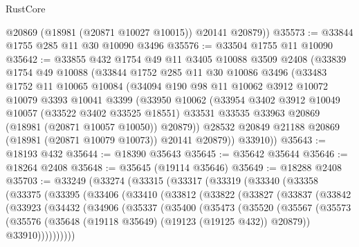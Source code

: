 \begin{lexlean}{RustCore}
\begin{coremodule}
        @20869
        (@18981 (@20871 @10027 @10015))
        @20141
        @20879))
@35573 := @33844 @1755 @285 @11 @30 @10090 @3496
@35576 := @33504 @1755 @11 @10090
@35642 := @33855
    @432
    @1754
    @49
    @11
    @3405
    @10088
    @3509
    @2408
    (@33839
      @1754
      @49
      @10088
      (@33844
        @1752
        @285
        @11
        @30
        @10086
        @3496
        (@33483
          @1752
          @11
          @10065
          @10084
          (@34094
            @190
            @98
            @11
            @10062
            @3912
            @10072
            @10079
            @3393
            @10041
            @3399
            (@33950
              @10062
              (@33954
                @3402
                @3912
                @10049
                @10057
                (@33522 @3402 @33525 @18551)
                @33531
                @33535
                @33963
                @20869
                (@18981 (@20871 @10057 @10050))
                @20879))
            @28532
            @20849
            @21188
            @20869
            (@18981 (@20871 @10079 @10073))
            @20141
            @20879))
        @33910))
@35643 := @18193 @432
@35644 := @18390 @35643
@35645 := @35642 @35644
@35646 := @18264 @2408
@35648 := @35645 (@19114 @35646)
@35649 := @18288 @2408
@35703 := @33249
    (@33274
      (@33315
        (@33317
          (@33319
            (@33340
              (@33358
                (@33375
                  (@33395
                    (@33406
                      (@33410
                        (@33812
                          (@33822
                            (@33827
                              (@33837
                                (@33842
                                  (@33923
                                    (@34432
                                      (@34906
                                        (@35337
                                          (@35400
                                            (@35473
                                              (@35520
                                                (@35567
                                                  (@35573
                                                    (@35576
                                                      (@35648
                                                        (@19118 @35649)
                                                        (@19123 (@19125 @432))
                                                        @20879))
                                                    @33910))))))))))

\end{coremodule}
\end{lexlean}
